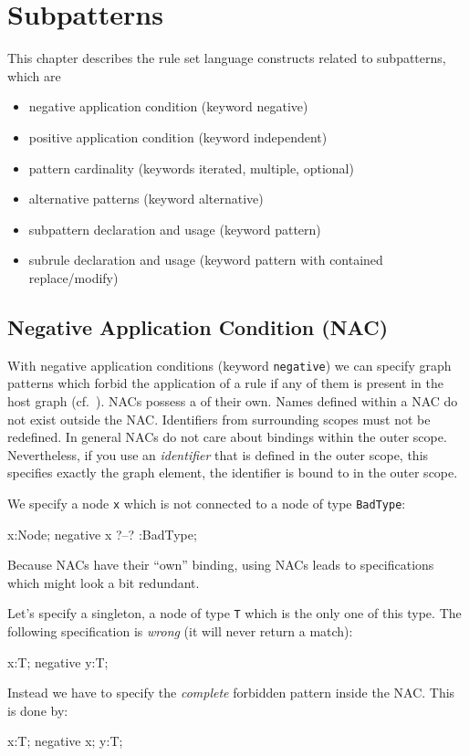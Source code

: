 \chapter{Subpatterns}
\label{chapsubpatterns}

This chapter describes the rule set language constructs related to subpatterns, which are
\begin{itemize}
\item negative application condition (keyword negative)
\item positive application condition (keyword independent)
\item pattern cardinality (keywords iterated, multiple, optional)
\item alternative patterns (keyword alternative)
\item subpattern declaration and usage (keyword pattern)
\item subrule declaration and usage (keyword pattern with contained replace/modify)
\end{itemize}

\section{Negative Application Condition (NAC)}
\label{nac}

  With negative application conditions (keyword \texttt{negative}) we can specify graph patterns which forbid the application of a rule if any of them is present in the host graph (cf.~\cite{adam}). 
  NACs possess a  of their own. 
  Names defined within a NAC do not exist outside the NAC. 
  Identifiers from surrounding scopes must not be redefined.
  In general NACs do not care about bindings within the outer scope. 
   Nevertheless, if you use an \emph{identifier} that is defined in the outer scope, this specifies exactly the graph element, the identifier is bound to in the outer scope.
  \begin{example}
    We specify a node \texttt{x} which is not connected to a node of type \texttt{BadType}:
    \begin{grgen}
  x:Node;
  negative {
    x ?--? :BadType;
  }
    \end{grgen}
  \end{example}
   Because NACs have their ``own'' binding, using NACs leads to specifications which might look a bit redundant.
  \begin{example}
    Let's specify a singleton, a node of type \texttt{T} which is the only one of this type.
    The following specification is \emph{wrong} (it will never return a match):
    \begin{grgen}
  x:T;
  negative {
    y:T;
  }
    \end{grgen}
    Instead we have to specify the \emph{complete} forbidden pattern inside the NAC. This is done by:
     \begin{grgen}
  x:T;
  negative {
    x;
    y:T;
  }
    \end{grgen}
  \end{example} 

